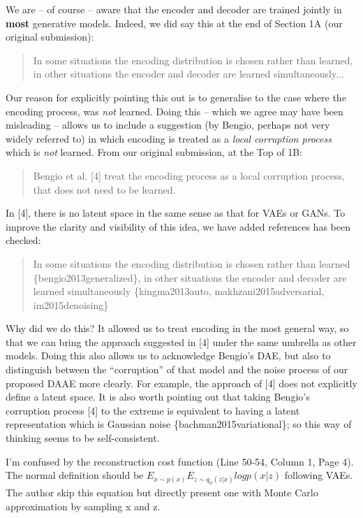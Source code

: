 \documentclass{article}
\begin{document}
 We are -- of course -- aware that the encoder and decoder are trained jointly in \textbf{most} generative models. Indeed, we did say this at the end of Section 1A (our original submission):
    \begin{quote}
        In some situations the encoding distribution is chosen rather than learned, in other  situations the encoder and decoder are learned simultaneously...
    \end{quote}
Our reason for explicitly pointing this out is to generalise to the case where the encoding process, was {\em not} learned. Doing this -- which we agree may have been misleading -- allows us to include a suggestion (by Bengio, perhaps not very widely referred to) in which encoding is treated as a {\em local corruption process} which is {\em not} learned.  From our original submission, at the Top of 1B:
    \begin{quote}
        Bengio  et  al.  [4]  treat  the  encoding  process  as  a  local corruption  process,  that  does  not  need  to  be  learned.
    \end{quote}
In [4], there is no latent space in the same sense as that for VAEs or GANs. To improve the clarity and visibility of this idea, we have added references {\color{red} has been checked}:
\begin{quote}
    In some situations the encoding distribution is chosen rather than learned \{bengio2013generalized\}, in other situations the encoder and decoder are learned simultaneously \{kingma2013auto, makhzani2015adversarial, im2015denoising\}
\end{quote}
Why did we do this?  It allowed us to treat encoding in the most general way, so that we can bring the approach suggested in [4] under the same umbrella as other models. Doing this also allows us to acknowledge Bengio's DAE, but also to distinguish between the ``corruption'' of that model and the noise process of our proposed DAAE more clearly. For example, the approach of [4] does not explicitly define a latent space.  It is also worth pointing out that taking Bengio's corruption process [4] to the extreme is equivalent to having a latent representation which is Gaussian noise \{bachman2015variational\}; so this way of thinking seems to be self-consistent.


{\color{blue}
I’m confused by the reconstruction cost function (Line 50-54, Column 1, Page 4). The normal definition should be $E_{x\sim p(x)} E_{z\sim q_{\phi}(z|x)} log p(x | z)$ following VAEs. The author skip this equation but directly present one with Monte Carlo approximation by sampling x and z. }\\
\end{document}
